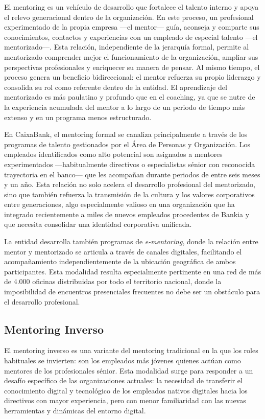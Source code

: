 El mentoring es un vehículo de desarrollo que fortalece el talento interno y apoya el relevo
generacional dentro de la organización. En este proceso, un profesional experimentado de la
propia empresa —el mentor— guía, aconseja y comparte sus conocimientos, contactos y
experiencias con un empleado de especial talento —el mentorizado—. Esta relación, independiente
de la jerarquía formal, permite al mentorizado comprender mejor el funcionamiento de la
organización, ampliar sus perspectivas profesionales y enriquecer su manera de pensar. Al mismo
tiempo, el proceso genera un beneficio bidireccional: el mentor refuerza su propio liderazgo
y consolida su rol como referente dentro de la entidad. El aprendizaje del mentorizado es más
paulatino y profundo que en el coaching, ya que se nutre de la experiencia acumulada del mentor
a lo largo de un periodo de tiempo más extenso y en un programa menos estructurado.

En CaixaBank, el mentoring formal se canaliza principalmente a través de los programas de
talento gestionados por el Área de Personas y Organización. Los empleados identificados como
alto potencial son asignados a mentores experimentados —habitualmente directivos o especialistas
sénior con reconocida trayectoria en el banco— que les acompañan durante periodos de entre
seis meses y un año. Esta relación no solo acelera el desarrollo profesional del mentorizado,
sino que también refuerza la transmisión de la cultura y los valores corporativos entre
generaciones, algo especialmente valioso en una organización que ha integrado recientemente
a miles de nuevos empleados procedentes de Bankia y que necesita consolidar una identidad
corporativa unificada.

La entidad desarrolla también programas de \textit{e-mentoring}, donde la relación entre
mentor y mentorizado se articula a través de canales digitales, facilitando el acompañamiento
independientemente de la ubicación geográfica de ambos participantes. Esta modalidad resulta
especialmente pertinente en una red de más de 4.000 oficinas distribuidas por todo el
territorio nacional, donde la imposibilidad de encuentros presenciales frecuentes no debe
ser un obstáculo para el desarrollo profesional.

\subsection{Mentoring Inverso}

El mentoring inverso es una variante del mentoring tradicional en la que los roles habituales
se invierten: son los empleados más jóvenes quienes actúan como mentores de los profesionales
sénior. Esta modalidad surge para responder a un desafío específico de las organizaciones
actuales: la necesidad de transferir el conocimiento digital y tecnológico de los empleados
nativos digitales hacia los directivos con mayor experiencia, pero con menor familiaridad con
las nuevas herramientas y dinámicas del entorno digital.

